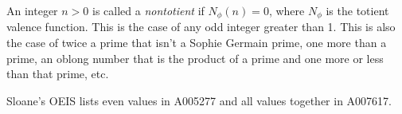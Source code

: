 \documentclass[12pt]{article}
\begin{document}
An integer $n > 0$ is called a {\it nontotient} if $N_{\phi}(n) = 0$, where $N_{\phi}$ is the totient valence function. This is the case of any odd integer greater than 1. This is also the case of twice a prime that isn't a Sophie Germain prime, one more than a prime, an oblong number that is the product of a prime and one more or less than that prime, etc.

Sloane's OEIS lists even values in A005277 and all values together in A007617.
\end{document}
